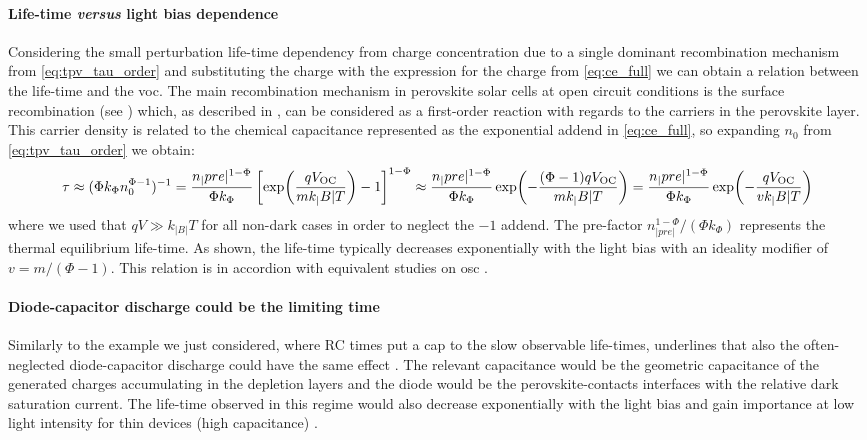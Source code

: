 	\paragraph{Life-time \textit{versus} light bias dependence}\label{tpv_tau_vs_intensity}
	Considering the small perturbation life-time dependency from charge concentration due to a single dominant recombination mechanism from \cref{eq:tpv_tau_order} and substituting the charge with the expression for the charge from \cref{eq:ce_full} we can obtain a relation between the life-time and the \gls{voc}.
	The main recombination mechanism in perovskite solar cells at open circuit conditions is the surface recombination (see ) which, as described in , can be considered as a first-order reaction with regards to the carriers \label{tpv_chemical_charge}in the perovskite layer.
	This carrier density is related to the chemical capacitance represented as the exponential addend in \cref{eq:ce_full}, so expanding $n_0$ from \cref{eq:tpv_tau_order} we obtain:
	\begin{dmath}\label{eq:tpv_tau_vs_intensity}
		\tau \approx (\Phi k_\Phi n_0^{\Phi-1})^{-1} = \frac{n_|pre|^{1-\Phi}}{\Phi k_\Phi} \left[\exp(\frac{q\voc}{mk_|B|T}) - 1\right]^{1-\Phi} \approx \frac{n_|pre|^{1-\Phi}}{\Phi k_\Phi} \exp(-\frac{(\Phi-1)q\voc}{mk_|B|T}) = \frac{n_|pre|^{1-\Phi}}{\Phi k_\Phi} \exp(-\frac{q\voc}{vk_|B|T})
	\end{dmath}
	where we used that $qV \gg k_|B|T$ for all non-dark cases in order to neglect the $-1$ addend.
	The pre-factor $n_|pre|^{1-\Phi}/(\Phi k_\Phi)$ represents the thermal equilibrium life-time.
	As shown, the life-time typically decreases exponentially with the light bias with an ideality modifier of $v = m/(\Phi-1)$.
	This relation is in accordion with equivalent studies on \gls{osc} \cite{Shuttle2008,Shuttle2008d,Credgington2011}.

\paragraph{Diode-capacitor discharge could be the limiting time}
Similarly to the example we just considered, where RC times put a cap to the slow observable life-times,  underlines that also the often-neglected diode-capacitor discharge could have the same effect \cite{Tvingstedt2017,Hellen2003}.
The relevant capacitance would be the geometric capacitance of the generated charges accumulating in the depletion layers and the diode would be the perovskite-contacts interfaces with the relative dark saturation current.
The life-time observed in this regime would also decrease exponentially with the light bias \cite{Castaner1981} and gain importance at low light intensity for thin devices (high capacitance) \cite{Kiermasch2018}.

